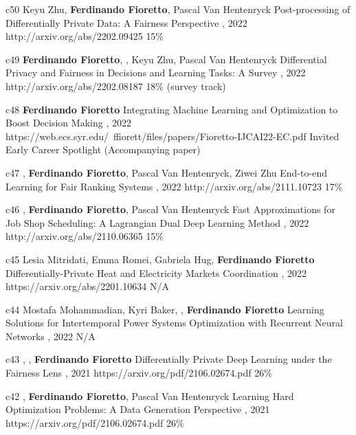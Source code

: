 \begin{pubs}
	\confentry
	{c50} %
	{Keyu Zhu, {\bf Ferdinando Fioretto}, Pascal Van Hentenryck}
	{Post-processing of Differentially Private Data: A Fairness Perspective}
	{\procIJCAI, 2022}
	{http://arxiv.org/abs/2202.09425}	
	{15\%}

	\confentry
	{c49} %
	{{\bf Ferdinando Fioretto}, , Keyu Zhu, Pascal Van Hentenryck}
	{Differential Privacy and Fairness in Decisions and Learning Tasks: A Survey}
	{\procIJCAI, 2022}
	{http://arxiv.org/abs/2202.08187}	
	{18\% (survey track)}

	\confentryAwd
	{c48} %
	{{\bf Ferdinando Fioretto}}
	{Integrating Machine Learning and Optimization to Boost Decision Making}
	{\procIJCAI, 2022}
	{https://web.ecs.syr.edu/~ffiorett/files/papers/Fioretto-IJCAI22-EC.pdf}	
	{Invited}
	{Early Career Spotlight}
	{(Accompanying paper)}

	\confentry
	{c47} %
	{, {\bf Ferdinando Fioretto}, Pascal Van Hentenryck, Ziwei Zhu}
	{End-to-end Learning for Fair Ranking Systems}
	{\procWWW, 2022}
	{http://arxiv.org/abs/2111.10723}	
	{17\%}
	
	\confentry
	{c46} %
	{, {\bf Ferdinando Fioretto}, Pascal Van Hentenryck}
	{Fast Approximations for Job Shop Scheduling: A Lagrangian Dual Deep Learning Method}
	{\procAAAI, 2022}
	{http://arxiv.org/abs/2110.06365}
	{15\%}

	\confentry
	{c45} %
	{Lesia Mitridati, Emma Romei, Gabriela Hug, {\bf Ferdinando Fioretto}}
	{Differentially-Private Heat and Electricity Markets Coordination}
	{\procPMAPS, 2022}
	{https://arxiv.org/abs/2201.10634}
	{N/A}
 
	\confentry
	{c44} %
	{Mostafa Mohammadian, Kyri Baker, , {\bf Ferdinando Fioretto}}
	{Learning Solutions for Intertemporal Power Systems Optimization with Recurrent Neural Networks}
	{\procPMAPS, 2022}
	{N/A}



	\confentry 
	{c43} %
	{, , {\bf Ferdinando Fioretto}}
	{Differentially Private Deep Learning under the Fairness Lens}
	{\procNeurIPS, 2021}
	{https://arxiv.org/pdf/2106.02674.pdf}
	{26\%} %

	\confentry 
	{c42} %
	{, {\bf Ferdinando Fioretto}, Pascal Van Hentenryck}
	{Learning Hard Optimization Problems: A Data Generation Perspective}
	{\procNeurIPS, 2021}
	{https://arxiv.org/pdf/2106.02674.pdf}
	{26\%} %


\end{pubs}
